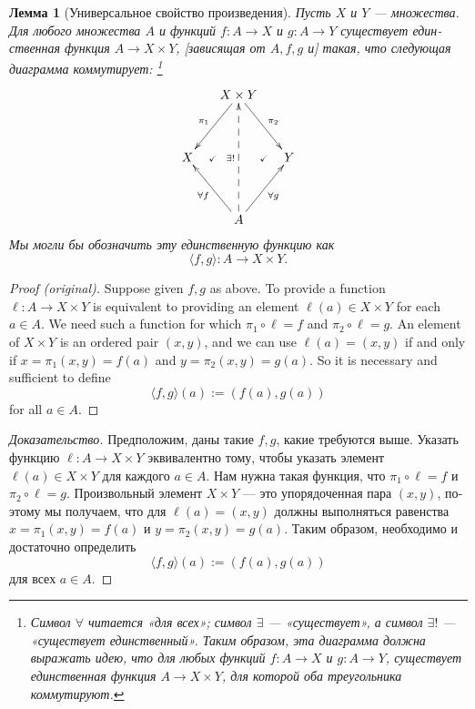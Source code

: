 \documentclass[a4paper]{book}
\def\to{\rightarrow}
\def\taking{\colon}
\def\la{\langle}
\def\ra{\rangle}
\newcommand{\prodmap}[2]{\la#1,#2\ra}
\theoremstyle{myth}
\newenvironment{proofENG}{\begin{proof}[Proof (original)]}{\end{proof}}
\newtheorem{lemmaRUS}[envRUS]{Лемма}
\newenvironment{proofRUS}{\begin{proof}[Доказательство]}{\end{proof}}
\begin{document}
\begin{russian}
\begin{lemmaRUS}[Универсальное свойство произведения]\label{lemma:up for prod}
Пусть $X$ и $Y$ — множества. Для любого множества $A$ и функций $f\taking A\to X$ и $g\taking A\to Y$ существует единственная функция $A\to X\times Y$, [зависящая от $A, f, g$ и] такая, что следующая диаграмма коммутирует:%
\footnote{Символ $\forall$ читается «для всех»; символ $\exists$ — «существует», а символ $\exists!$ — «существует единственный». Таким образом, эта диаграмма должна выражать идею, что для любых функций $f\taking A\to X$ и $g\taking A\to Y$, существует единственная функция $A\to X\times Y$, для которой оба треугольника коммутируют.}
\begin{align}\label{dia:univ prop for products}
\xymatrix@=15pt{&X\times Y\ar[ldd]_{\pi_1}\ar[rdd]^{\pi_2}\\\\X\ar@{}[r]|{\checkmark}&&Y\ar@{}[l]|{\checkmark}\\\\&A\ar[luu]^{\forall f}\ar[ruu]_{\forall g}\ar@{-->}[uuuu]^{\exists !}}
\end{align}
Мы могли бы обозначить эту единственную функцию как $$\prodmap{f}{g}\taking A\to X\times Y.$$
\end{lemmaRUS}

\begin{proofENG}
Suppose given $f,g$ as above. To provide a function $\ell\taking A\to X\times Y$ is equivalent to providing an element $\ell(a)\in X\times Y$ for each $a\in A$. We need such a function for which $\pi_1\circ \ell=f$ and $\pi_2\circ \ell=g$. An element of $X\times Y$ is an ordered pair $(x,y)$, and we can use $\ell(a)=(x,y)$ if and only if $x=\pi_1(x,y)=f(a)$ and $y=\pi_2(x,y)=g(a)$. So it is necessary and sufficient to define $$\prodmap{f}{g}(a):=(f(a),g(a))$$ for all $a\in A$.
\end{proofENG}

\begin{proofRUS}
Предположим, даны такие $f,g$, какие требуются выше. Указать функцию $\ell\taking A\to X\times Y$ эквивалентно тому, чтобы указать элемент $\ell(a)\in X\times Y$ для каждого $a\in A$. Нам нужна такая функция, что $\pi_1\circ \ell=f$ и $\pi_2\circ \ell=g$. Произвольный элемент $X\times Y$ — это упорядоченная пара $(x,y)$, поэтому мы получаем, что для $\ell(a)=(x,y)$ должны выполняться равенства $x=\pi_1(x,y)=f(a)$ и $y=\pi_2(x,y)=g(a)$. Таким образом, необходимо и достаточно определить $$\prodmap{f}{g}(a):=(f(a),g(a))$$ для всех $a\in A$.
\end{proofRUS}


\end{russian}
\end{document}
